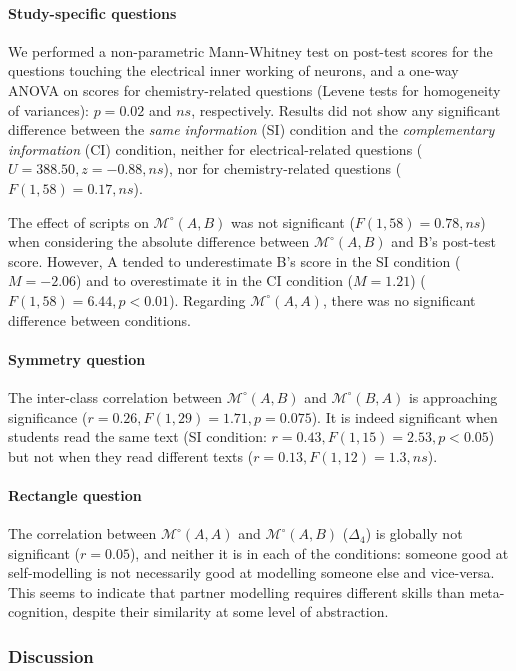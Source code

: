\documentclass[natbib]{svjour3}
\newcommand{\A}{A\xspace}
\newcommand{\B}{B\xspace}
\newcommand{\gModel}[2]{{$\mathcal{M}^{\circ}(#1, #2)$}}
\begin{document}
\paragraph{Study-specific questions} We performed a non-parametric Mann-Whitney
test on post-test scores for the questions touching the electrical inner working
of neurons, and a one-way ANOVA on scores for chemistry-related questions
(Levene tests for homogeneity of variances): $p = 0.02$ and $ns$, respectively.
Results did not show any significant difference between the \emph{same
information} (SI) condition and the \emph{complementary information} (CI)
condition, neither for electrical-related questions ($U = 388.50, z = -0.88,
ns$), nor for chemistry-related questions ($F(1, 58) = 0.17, ns$).

The effect of scripts on \gModel{A}{B} was not significant ($F(1, 58) = 0.78,
ns$) when considering the absolute difference between \gModel{A}{B} and \B's
post-test score. However, \A tended to underestimate \B's score in the SI
condition ($M = -2.06$) and to overestimate it in the CI condition ($M = 1.21$)
($F(1, 58) = 6.44, p<0.01$).  Regarding \gModel{A}{A}, there was no
significant difference between conditions.

\paragraph{Symmetry question} The inter-class correlation between \gModel{A}{B}
and \gModel{B}{A} is approaching significance ($r= 0.26, F(1,29)=1.71, p=
0.075$). It is indeed significant when students read the same text (SI
condition: $r=0.43, F(1,15)=2.53, p<0.05$) but not when they read different texts
($r= 0.13, F(1,12)=1.3, ns$). 

\paragraph{Rectangle question} The correlation between \gModel{A}{A} and
\gModel{A}{B} ($\Delta_4$) is globally not significant ($r=0.05$), and neither
it is in each of the conditions: someone good at self-modelling is not necessarily
good at modelling someone else and vice-versa.  This seems to indicate that
partner modelling requires different skills than meta-cognition, despite their
similarity at some level of abstraction.

\subsubsection*{Discussion}
\end{document}
